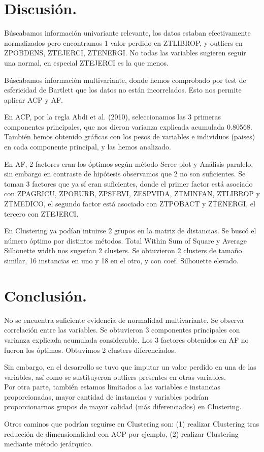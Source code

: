 \documentclass[11pt,a4paper]{article}
\begin{document}
	\section{Discusión.}
	Búscabamos información univariante relevante, los datos estaban efectivamente normalizados pero encontramos 1 valor perdido en ZTLIBROP, y outliers en ZPOBDENS, ZTEJERCI, ZTENERGI. No todas las variables sugieren seguir una normal, en especial ZTEJERCI es la que menos.
	
	Búscabamos información multivariante, donde hemos comprobado por test de esfericidad de Bartlett que los datos no están incorrelados. Esto nos permite aplicar ACP y AF. 
	
	En ACP, por la regla Abdi et al. (2010), seleccionamos las 3 primeras componentes principales, que nos dieron varianza explicada acumulada 0.80568. También hemos obtenido gráficas con los pesos de variables e individuos (paises) en cada componente principal, y las hemos analizado.
	
	En AF, 2 factores eran los óptimos según método Scree plot y Análisis paralelo, sin embargo en contraste de hipótesis observamos que 2 no son suficientes. Se toman 3 factores que ya sí eran suficientes, donde el primer factor está asociado con ZPAGRICU, ZPOBURB, ZPSERVI, ZESPVIDA, ZTMINFAN, ZTLIBROP y ZTMEDICO, el segundo factor está asociado con ZTPOBACT y ZTENERGI, el tercero con ZTEJERCI.
	
	En Clustering ya podían intuirse 2 grupos en la matriz de distancias. Se buscó el número óptimo por distintos métodos. Total Within Sum of Square y Average Silhouette width nos sugerían 2 clusters. Se obtuvieron 2 clusters de tamaño similar, 16 instancias en uno y 18 en el otro, y con coef. Silhouette elevado.
	\section{Conclusión.}
	No se encuentra suficiente evidencia de normalidad multivariante. Se observa correlación entre las variables. Se obtuvieron 3 componentes principales con varianza explicada acumulada considerable. Los 3 factores obtenidos en AF no fueron los óptimos. Obtuvimos 2 clusters diferenciados.
	
	Sin embargo, en el desarrollo se tuvo que imputar un valor perdido en una de las variables, así como se sustituyeron outliers presentes en otras variables.\\
	
	 Por otra parte, también estamos limitados a las variables e instancias proporcionadas, mayor cantidad de instancias y variables podrían proporcionarnos grupos de mayor calidad (más diferenciados) en Clustering.
	
	Otros caminos que podrían seguirse en Clustering son: (1) realizar Clustering tras reducción de dimensionalidad con ACP por ejemplo, (2) realizar Clustering mediante método jerárquico.
    
\end{document}
